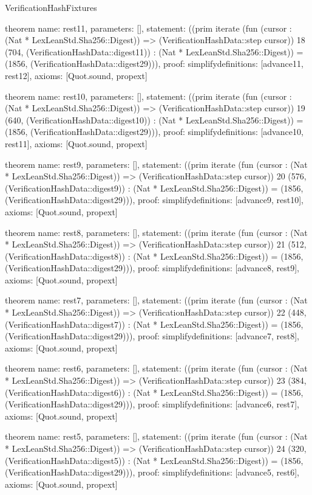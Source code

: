 \begin{lexlean}{VerificationHashFixtures}
\begin{semanticmodule}
theorem{
  name: rest11,
  parameters: [],
  statement: ((prim iterate (fun (cursor : (Nat * LexLeanStd.Sha256::Digest)) => (VerificationHashData::step cursor)) 18 (704, (VerificationHashData::digest11)) : (Nat * LexLeanStd.Sha256::Digest)) = (1856, (VerificationHashData::digest29))),
  proof: simplify{definitions: [advance11, rest12]},
  axioms: [Quot.sound, propext]
}

theorem{
  name: rest10,
  parameters: [],
  statement: ((prim iterate (fun (cursor : (Nat * LexLeanStd.Sha256::Digest)) => (VerificationHashData::step cursor)) 19 (640, (VerificationHashData::digest10)) : (Nat * LexLeanStd.Sha256::Digest)) = (1856, (VerificationHashData::digest29))),
  proof: simplify{definitions: [advance10, rest11]},
  axioms: [Quot.sound, propext]
}

theorem{
  name: rest9,
  parameters: [],
  statement: ((prim iterate (fun (cursor : (Nat * LexLeanStd.Sha256::Digest)) => (VerificationHashData::step cursor)) 20 (576, (VerificationHashData::digest9)) : (Nat * LexLeanStd.Sha256::Digest)) = (1856, (VerificationHashData::digest29))),
  proof: simplify{definitions: [advance9, rest10]},
  axioms: [Quot.sound, propext]
}

theorem{
  name: rest8,
  parameters: [],
  statement: ((prim iterate (fun (cursor : (Nat * LexLeanStd.Sha256::Digest)) => (VerificationHashData::step cursor)) 21 (512, (VerificationHashData::digest8)) : (Nat * LexLeanStd.Sha256::Digest)) = (1856, (VerificationHashData::digest29))),
  proof: simplify{definitions: [advance8, rest9]},
  axioms: [Quot.sound, propext]
}

theorem{
  name: rest7,
  parameters: [],
  statement: ((prim iterate (fun (cursor : (Nat * LexLeanStd.Sha256::Digest)) => (VerificationHashData::step cursor)) 22 (448, (VerificationHashData::digest7)) : (Nat * LexLeanStd.Sha256::Digest)) = (1856, (VerificationHashData::digest29))),
  proof: simplify{definitions: [advance7, rest8]},
  axioms: [Quot.sound, propext]
}

theorem{
  name: rest6,
  parameters: [],
  statement: ((prim iterate (fun (cursor : (Nat * LexLeanStd.Sha256::Digest)) => (VerificationHashData::step cursor)) 23 (384, (VerificationHashData::digest6)) : (Nat * LexLeanStd.Sha256::Digest)) = (1856, (VerificationHashData::digest29))),
  proof: simplify{definitions: [advance6, rest7]},
  axioms: [Quot.sound, propext]
}

theorem{
  name: rest5,
  parameters: [],
  statement: ((prim iterate (fun (cursor : (Nat * LexLeanStd.Sha256::Digest)) => (VerificationHashData::step cursor)) 24 (320, (VerificationHashData::digest5)) : (Nat * LexLeanStd.Sha256::Digest)) = (1856, (VerificationHashData::digest29))),
  proof: simplify{definitions: [advance5, rest6]},
  axioms: [Quot.sound, propext]
}


\end{semanticmodule}
\end{lexlean}
